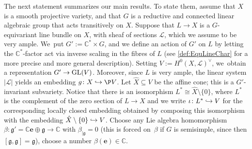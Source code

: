 \documentclass[JEP,XML,SOM,Unicode,published]{cedram}
\let\mathds\mathbb
\newcommand\hto{\mathrel{\lhook\joinrel\to}}
\newcommand{\bme}{{\boldsymbol{e}}}
\newcommand{\dC}{{\mathds C}}\let\C\dC
\newcommand{\Ell}{\mathscr{L}}
\newcommand{\frg}{\mathfrak{g}}
\DeclareMathOperator{\GL}{\textup{GL}}
\begin{document}
The next statement summarizes our main results.
To state them, assume that $X$ is a smooth projective variety, and that $G$ is a reductive and connected linear algebraic group that acts transitively on $X$. Suppose that $L\to X$ is a $G$-equivariant line bundle on $X$, with sheaf of sections $\Ell$,
which we assume to be very ample. We~put $G':=\dC^*\times G$, and we define an action of $G'$ on $L$ by letting the $\dC^*$-factor act via inverse scaling in the fibres of $L$ (see \cref{def:EquLineChar} for a more precise and more general description). Setting $V:=H^0(X, \mathscr{L})^\vee$, we~obtain a representation $G'\to \GL(V)$. Moreover, since $L$ is very ample, the linear system $|\mathscr{L}|$ yields an embedding $g\colon X\hto \P V$. Let $\hat{X}\subseteq V$ be the affine cone; this is a $G'$-invariant subvariety.
Notice that there is an isomorphism $L^* \cong \hat{X}\setminus \{0\}$, where $L^*$ is the complement of the zero section of $L\to X$
and we write
$\iota \colon L^* \hto V$ for the corresponding locally closed embedding obtained by composing this isomorphism with the embedding $\hat{X}\setminus\{0\}\hto V$.
Choose any Lie algebra homomorphism $\beta\colon \frg'=\dC\bme\oplus \frg\to \dC$ with $\beta_{|\frg}=0$ (this is forced on~$\beta$ if $G$ is semisimple, since then $[\frg,\frg]=\frg$), \ie choose a number $\beta(\bme)\in \dC$. 
\end{document}
